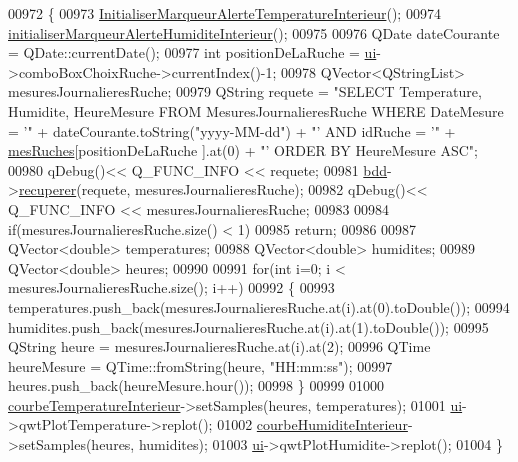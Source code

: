 \begin{DoxyCode}
00972 \{
00973     \hyperlink{class_ruche_ihm_a0f44cb030202047fa9a364dfcbf9a13f}{InitialiserMarqueurAlerteTemperatureInterieur}();
00974     \hyperlink{class_ruche_ihm_a42785d6da8aca09d8becb6d500de8d9f}{initialiserMarqueurAlerteHumiditeInterieur}();
00975 
00976     QDate dateCourante = QDate::currentDate();
00977     \textcolor{keywordtype}{int} positionDeLaRuche = \hyperlink{class_ruche_ihm_a64786058bd7f88ca2f1e9743bb27c25b}{ui}->comboBoxChoixRuche->currentIndex()-1;
00978     QVector<QStringList> mesuresJournalieresRuche;
00979     QString requete = \textcolor{stringliteral}{"SELECT Temperature, Humidite, HeureMesure FROM MesuresJournalieresRuche WHERE
       DateMesure = '"} + dateCourante.toString(\textcolor{stringliteral}{"yyyy-MM-dd"}) + \textcolor{stringliteral}{"' AND idRuche = '"} + \hyperlink{class_ruche_ihm_ab7741fa67b19cbb2da7eb12c58cf83c1}{mesRuches}[positionDeLaRuche
      ].at(0) + \textcolor{stringliteral}{"' ORDER BY HeureMesure ASC"};
00980     qDebug()<< Q\_FUNC\_INFO << requete;
00981     \hyperlink{class_ruche_ihm_a0851936fe212e8d40538264f09749153}{bdd}->\hyperlink{class_base_de_donnees_a77539baad389f5acf754cd2cd452403e}{recuperer}(requete, mesuresJournalieresRuche);
00982     qDebug()<< Q\_FUNC\_INFO << mesuresJournalieresRuche;
00983 
00984     \textcolor{keywordflow}{if}(mesuresJournalieresRuche.size() < 1)
00985         \textcolor{keywordflow}{return};
00986 
00987     QVector<double> temperatures;
00988     QVector<double> humidites;
00989     QVector<double> heures;
00990 
00991     \textcolor{keywordflow}{for}(\textcolor{keywordtype}{int} i=0; i < mesuresJournalieresRuche.size(); i++)
00992     \{
00993         temperatures.push\_back(mesuresJournalieresRuche.at(i).at(0).toDouble());
00994         humidites.push\_back(mesuresJournalieresRuche.at(i).at(1).toDouble());
00995         QString heure = mesuresJournalieresRuche.at(i).at(2);
00996         QTime heureMesure = QTime::fromString(heure, \textcolor{stringliteral}{"HH:mm:ss"});
00997         heures.push\_back(heureMesure.hour());
00998     \}
00999 
01000     \hyperlink{class_ruche_ihm_a6ce372c8df13bb78c09705432dcfcf58}{courbeTemperatureInterieur}->setSamples(heures, temperatures);
01001     \hyperlink{class_ruche_ihm_a64786058bd7f88ca2f1e9743bb27c25b}{ui}->qwtPlotTemperature->replot();
01002     \hyperlink{class_ruche_ihm_a19a58f5841dc91eb7f84acd419f35678}{courbeHumiditeInterieur}->setSamples(heures, humidites);
01003     \hyperlink{class_ruche_ihm_a64786058bd7f88ca2f1e9743bb27c25b}{ui}->qwtPlotHumidite->replot();
01004 \}
\end{DoxyCode}
\mbox{\label{class_ruche_ihm_a7f66af552d9e7ba0d00437ff3b330706}} 
